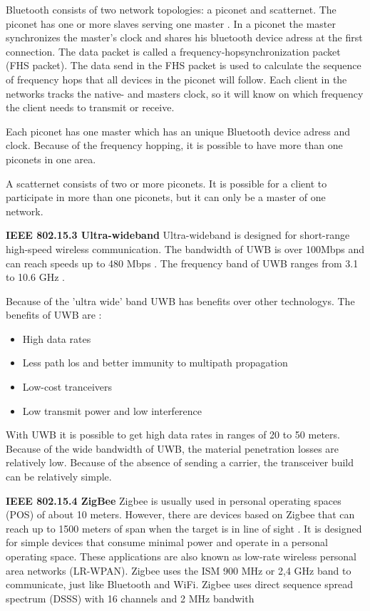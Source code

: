 \documentclass[10pt,a4paper]{article}
\begin{document}
Bluetooth consists of two network topologies: a piconet and scatternet. The piconet has one or more slaves serving one master \cite{bluetoothpiconet}. In a piconet the master synchronizes the master's clock and shares his bluetooth device adress at the first connection. The data packet is called a frequency-hopsynchronization packet (FHS packet). The data send in the FHS packet is used to calculate the sequence of frequency hops that all devices in the piconet will follow. Each client in the networks tracks the native- and masters clock, so it will know on which frequency the client needs to transmit or receive.

Each piconet has one master which has an unique Bluetooth device adress and clock. Because of the frequency hopping, it is possible to have more than one piconets in one area. 

A scatternet consists of two or more piconets. It is possible for a client to participate in more than one piconets, but it can only be a master of one network.

\textbf{IEEE 802.15.3 Ultra-wideband}
Ultra-wideband is designed for short-range high-speed wireless communication. The bandwidth of UWB is over 100Mbps and can reach speeds up to 480 Mbps \cite{comparitivestudywirelessprotocols}. The frequency band of UWB ranges from 3.1 to 10.6 GHz \cite{ultrawidebandwirelesscommunications}.

Because of the 'ultra wide' band UWB has benefits over other technologys. The benefits of UWB are \cite{ultrawidebandwirelesscommunications}: 
\begin{itemize}
\setlength\itemsep{0em}
    \item High data rates
    \item Less path los and better immunity to multipath propagation
    \item Low-cost tranceivers
    \item Low transmit power and low interference
\end{itemize}
 With UWB it is possible to get high data rates in ranges of 20 to 50 meters. Because of the wide bandwidth of UWB, the material penetration losses are relatively low. Because of the absence of sending a carrier, the transceiver build can be relatively simple. \cite{ultrawidebandwirelesscommunications}

\textbf{IEEE 802.15.4 ZigBee}
Zigbee is usually used in personal operating spaces (POS) of about 10 meters. However, there are devices based on Zigbee that can reach up to 1500 meters of span when the target is in line of sight \cite{zigbeewiki}. It is designed for simple devices that consume minimal power and operate in a personal operating space. These applications are also known as low-rate wireless personal area networks (LR-WPAN). \cite{comparitivestudywirelessprotocols} Zigbee uses the ISM 900 MHz or 2,4 GHz band to communicate, just like Bluetooth and WiFi. Zigbee uses direct sequence spread spectrum (DSSS) with 16 channels and 2 MHz bandwith
\end{document}

